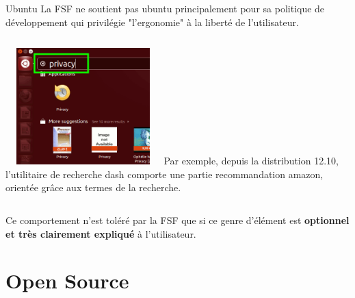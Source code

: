\begin{frame}[t,fragile]{Ubuntu}
    \fontsize{9}{10}\selectfont
    La FSF ne soutient pas ubuntu principalement pour sa politique de développement qui privilégie "l'ergonomie" à la liberté de l'utilisateur.\linebreak \pause
        \begin{columns}
                \centering \includegraphics[height=4.5cm, width=6cm]{ubuntu-1210-dash}
    Par exemple, depuis la distribution 12.10, l'utilitaire de recherche dash comporte une partie recommandation amazon, orientée grâce aux termes de la recherche. \linebreak \pause
        \end{columns}
        \fontsize{9}{12}\selectfont
    Ce comportement n'est toléré par la FSF que si ce genre d'élément est \textbf{optionnel et très clairement expliqué} à l'utilisateur.
    
\end{frame}




\section{Open Source}

